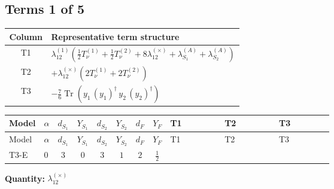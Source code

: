 \documentclass[8pt]{article}
\begin{document}
\begin{landscape}
\subsection*{Terms 1 of 5}
\begin{center}
\begin{tabular}{@{}c >{\raggedright\arraybackslash}p{0.82\linewidth}@{}}
\toprule
Column & Representative term structure \\
\midrule
T1 & \(\displaystyle {\lambda_{12}^{(1)}} \left(\frac{1}{2} T_{\nu}^{(1)}+\frac{1}{2} T_{\nu}^{(2)}+8 {\lambda_{12}^{(\times)}}+{\lambda_{S_1}^{(A)}}+{\lambda_{S_2}^{(A)}}\right)\) \\
\midrule
T2 & \(\displaystyle +{\lambda_{12}^{(\times)}} (2 T_{\nu}^{(1)}+2 T_{\nu}^{(2)})\) \\
\midrule
T3 & \(\displaystyle -\frac{7}{6} \operatorname{Tr}\!\left({y_1}\,\left({y_1}\right)^{\dagger}\,{y_2}\,\left({y_2}\right)^{\dagger}\right)\) \\
\midrule
\bottomrule
\end{tabular}
\end{center}
\smallskip
\tiny
\begin{longtable}{@{}llcccccc >{\raggedright\arraybackslash}p{0.21\linewidth} >{\raggedright\arraybackslash}p{0.21\linewidth} >{\raggedright\arraybackslash}p{0.21\linewidth}@{}}
\toprule
Model & $\alpha$ & $d_{S_1}$ & $Y_{S_1}$ & $d_{S_2}$ & $Y_{S_2}$ & $d_F$ & $Y_F$ & T1 & T2 & T3 \\
\midrule
\endfirsthead
\toprule
Model & $\alpha$ & $d_{S_1}$ & $Y_{S_1}$ & $d_{S_2}$ & $Y_{S_2}$ & $d_F$ & $Y_F$ & T1 & T2 & T3 \\
\midrule
\endhead
T3-E & $0$ & $3$ & $0$ & $3$ & $1$ & $2$ & $\frac{1}{2}$ & \scriptsize\adjustbox{max width=\linewidth}{$\begin{gathered} {\lambda_{12}^{(1)}} \left(\frac{1}{2} T_{\nu}^{(1)}+\frac{1}{2} T_{\nu}^{(2)}+8 {\lambda_{12}^{(\times)}}+{\lambda_{S_1}^{(A)}}+{\lambda_{S_2}^{(A)}}\right)\end{gathered}$} & \scriptsize\adjustbox{max width=\linewidth}{$\begin{gathered} +{\lambda_{12}^{(\times)}} (2 T_{\nu}^{(1)}+2 T_{\nu}^{(2)})\end{gathered}$} & \scriptsize\adjustbox{max width=\linewidth}{$\begin{gathered} -\frac{7}{6} \operatorname{Tr}\!\left({y_1}\,\left({y_1}\right)^{\dagger}\,{y_2}\,\left({y_2}\right)^{\dagger}\right)\end{gathered}$} \\
\midrule
\bottomrule
\end{longtable}
\clearpage
\noindent\textbf{Quantity: }$\lambda_{12}^{(\times)}$\par\smallskip

\end{landscape}
\end{document}
